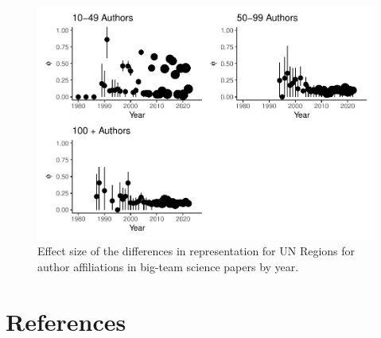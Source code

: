 \documentclass[
  man]{apa7}
\begin{document}
\begin{figure}
\centering
\includegraphics{manuscript_scopus_files/figure-latex/effect-gpe-figure-1.pdf}
\caption{\label{fig:effect-gpe-figure}Effect size of the differences in representation for UN Regions for author affiliations in big-team science papers by year.}
\end{figure}

\newpage

\hypertarget{references}{%
\section{References}\label{references}}

\begingroup
\setlength{\parindent}{-0.5in}
\setlength{\leftskip}{0.5in}
\end{document}
